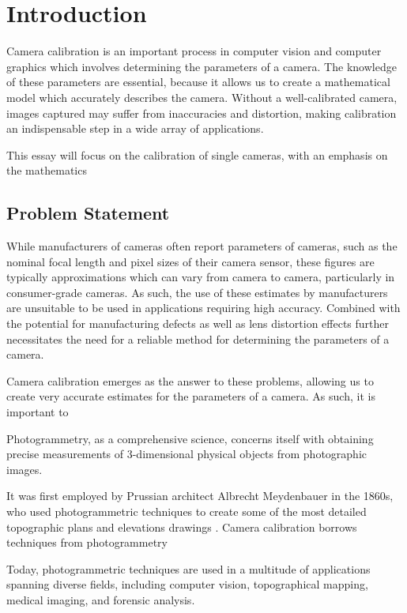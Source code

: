\section{Introduction}

Camera calibration is an important process in computer vision and computer graphics which involves determining the parameters of a camera. The knowledge of these parameters are essential, because it allows us to create a mathematical model which accurately describes the camera. Without a well-calibrated camera, images captured may suffer from inaccuracies and distortion, making calibration an indispensable step in a wide array of applications.

This essay will focus on the calibration of single cameras, with an emphasis on the mathematics 

\subsection{Problem Statement}

While manufacturers of cameras often report parameters of cameras, such as the nominal focal length and pixel sizes of their camera sensor, these figures are typically approximations which can vary from camera to camera, particularly in consumer-grade cameras. As such, the use of these estimates by manufacturers are unsuitable to be used in applications requiring high accuracy. Combined with the potential for manufacturing defects as well as lens distortion effects further necessitates the need for a reliable method for determining the parameters of a camera. 

Camera calibration emerges as the answer to these problems, allowing us to create very accurate estimates for the parameters of a camera. As such, it is important to  

Photogrammetry, as a comprehensive science, concerns itself with obtaining precise measurements of 3-dimensional physical objects from photographic images. 

It was first employed by Prussian architect Albrecht Meydenbauer in the 1860s, who used photogrammetric techniques to create some of the most detailed topographic plans and elevations drawings \autocite{ices2017}. 
Camera calibration borrows techniques from photogrammetry 

Today, photogrammetric techniques are used in a multitude of applications spanning diverse fields, including computer vision, topographical mapping, medical imaging, and forensic analysis.



